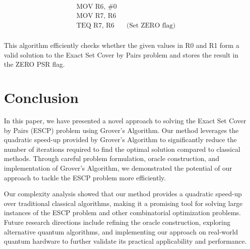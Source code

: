 \begin{align*}
\text{MOV R6, \#0} \\
\text{MOV R7, R6} \\
\text{TEQ R7, R6} \quad &\text{(Set ZERO flag)} \\
\end{align*}

This algorithm efficiently checks whether the given values in R0 and R1 form a valid solution to the Exact Set Cover by Pairs problem and stores the result in the ZERO PSR flag.

\section{Conclusion} \label{sec:conclusion}

In this paper, we have presented a novel approach to solving the Exact Set Cover by Pairs (ESCP) problem using Grover's Algorithm. Our method leverages the quadratic speed-up provided by Grover's Algorithm to significantly reduce the number of iterations required to find the optimal solution compared to classical methods. Through careful problem formulation, oracle construction, and implementation of Grover's Algorithm, we demonstrated the potential of our approach to tackle the ESCP problem more efficiently.

Our complexity analysis showed that our method provides a quadratic speed-up over traditional classical algorithms, making it a promising tool for solving large instances of the ESCP problem and other combinatorial optimization problems. Future research directions include refining the oracle construction, exploring alternative quantum algorithms, and implementing our approach on real-world quantum hardware to further validate its practical applicability and performance.

